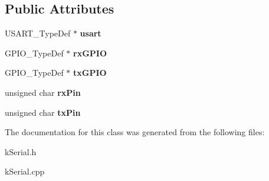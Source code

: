 \subsection*{Public Attributes}
\begin{DoxyCompactItemize}
\item 
U\+S\+A\+R\+T\+\_\+\+Type\+Def $\ast$ {\bfseries usart}\hypertarget{classkSerialHardware_ac74d9a671e3f17991973e194f41325d6}{}\label{classkSerialHardware_ac74d9a671e3f17991973e194f41325d6}

\item 
G\+P\+I\+O\+\_\+\+Type\+Def $\ast$ {\bfseries rx\+G\+P\+IO}\hypertarget{classkSerialHardware_a4d69675eb57aef95f60c6995c1031769}{}\label{classkSerialHardware_a4d69675eb57aef95f60c6995c1031769}

\item 
G\+P\+I\+O\+\_\+\+Type\+Def $\ast$ {\bfseries tx\+G\+P\+IO}\hypertarget{classkSerialHardware_a264a40a7a1dab7ab197fd7f027d529b6}{}\label{classkSerialHardware_a264a40a7a1dab7ab197fd7f027d529b6}

\item 
unsigned char {\bfseries rx\+Pin}\hypertarget{classkSerialHardware_a8698d5e16bf65bdeff45e0e40aa3176a}{}\label{classkSerialHardware_a8698d5e16bf65bdeff45e0e40aa3176a}

\item 
unsigned char {\bfseries tx\+Pin}\hypertarget{classkSerialHardware_a4cdf800872615a21ea4186b2f2700016}{}\label{classkSerialHardware_a4cdf800872615a21ea4186b2f2700016}

\end{DoxyCompactItemize}


The documentation for this class was generated from the following files\+:\begin{DoxyCompactItemize}
\item 
k\+Serial.\+h\item 
k\+Serial.\+cpp\end{DoxyCompactItemize}
